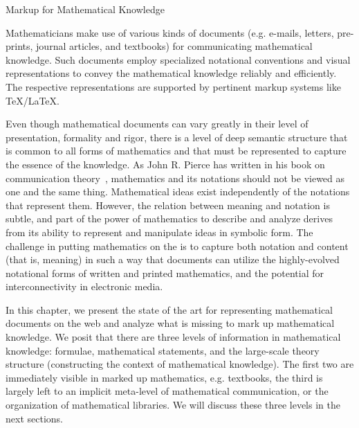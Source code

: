 
\begin{omgroup}[id=math-markup]{Markup for Mathematical Knowledge}

  Mathematicians make use of various kinds of documents (e.g. e-mails, letters,
  pre-prints, journal articles, and textbooks) for communicating mathematical
  knowledge. Such documents employ specialized notational conventions and visual
  representations to convey the mathematical knowledge reliably and efficiently.  The
  respective representations are supported by pertinent markup systems like {\TeX/\LaTeX}.

  Even though mathematical documents can vary greatly in their level of presentation,
  formality and rigor, there is a level of deep semantic structure that is common to all
  forms of mathematics and that must be represented to capture the essence of the
  knowledge. As John R. Pierce has written in his book on communication
  theory~\cite{Pierce:aitit80}, mathematics and its notations should not be viewed as one
  and the same thing. Mathematical ideas exist independently of the notations that
  represent them. However, the relation between meaning and notation is subtle, and part
  of the power of mathematics to describe and analyze derives from its ability to
  represent and manipulate ideas in symbolic form. The challenge in putting mathematics on
  the {} is to capture both notation and content (that is,
  meaning) in such a way that documents can utilize the highly-evolved notational forms of
  written and printed mathematics, and the potential for interconnectivity in electronic
  media.

  In this chapter, we present the state of the art for representing mathematical documents
  on the web and analyze what is missing to mark up mathematical knowledge.  We posit that
  there are three levels of information in mathematical knowledge: formulae, mathematical
  statements, and the large-scale theory structure (constructing the context of
  mathematical knowledge). The first two are immediately visible in marked up mathematics,
  e.g.  textbooks, the third is largely left to an implicit meta-level of mathematical
  communication, or the organization of mathematical libraries. We will discuss these
  three levels in the next sections.


\end{omgroup}
